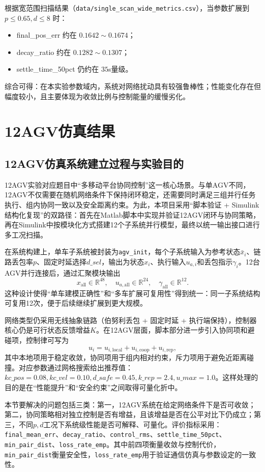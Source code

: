 \documentclass[12pt,a4paper]{article}
\begin{document}
根据宽范围扫描结果（\texttt{data/single\_scan\_wide\_metrics.csv}），当参数扩展到
$p\le0.65, d\le8$ 时：
\begin{itemize}
    \item final\_pos\_err 约在 $0.1642\sim0.1674$；
    \item decay\_ratio 约在 $0.1282\sim0.1307$；
    \item settle\_time\_50pct 仍约在 $35$s量级。
\end{itemize}
综合可得：在本实验参数域内，系统对网络扰动具有较强鲁棒性；性能变化存在但幅度较小，且主要体现为收敛比例与控制能量的缓慢劣化。

\section{12AGV仿真结果}
\subsection{12AGV仿真系统建立过程与实验目的}
12AGV实验对应题目中“多移动平台协同控制”这一核心场景。与单AGV不同，12AGV不仅需要在随机网络条件下保持闭环稳定，还需要同时满足三组并行任务执行、组内协同一致以及安全距离约束。为此，本项目采用“脚本验证 + Simulink结构化复现”的双路径：首先在Matlab脚本中实现并验证12AGV闭环与协同策略，再在Simulink中按模块化方式搭建12个子系统并行模型，最终以统一输出接口进行多工况扫描。

在系统构建上，单车子系统被封装为\texttt{agv\_init}，每个子系统输入为参考状态$\bar x_i$、链路丢包率$p$、固定时延选择$d\_{sel}$，输出为状态$x_i$、执行输入$u_{a,i}$和丢包指示$\gamma_i$。12台AGV并行连接后，通过汇聚模块输出
\[
x_{\text{all}}\in\mathbb{R}^{48},\quad
u_{a,\text{all}}\in\mathbb{R}^{24},\quad
\gamma_{\text{all}}\in\mathbb{R}^{12}.
\]
这种设计使得“单车建模正确性”和“多车扩展可复用性”得到统一：同一子系统结构可复用12次，便于后续继续扩展到更大规模。

网络类型仍采用无线抽象链路（伯努利丢包 + 固定时延 + 执行端保持），控制器核心仍是可行状态反馈增益$K$。在12AGV层面，脚本部分进一步引入协同项和避碰项，控制律可写为
\[
u_i=u_{i,\text{local}}+u_{i,\text{coop}}+u_{i,\text{rep}},
\]
其中本地项用于稳定收敛，协同项用于组内相对约束，斥力项用于避免近距离碰撞。对应参数通过网格搜索给出推荐值：$kc\_pos=0.08, kc\_vel=0.10, d\_safe=0.45, k\_rep=2.4, u\_max=1.0$。这样处理的目的是在“性能提升”和“安全约束”之间取得可量化折中。

本节要解决的问题包括三类：第一，12AGV系统在给定网络条件下是否可收敛；第二，协同策略相对独立控制是否有增益，且该增益是否在公平对比下仍成立；第三，不同$p,d$工况下系统级性能是否可解释、可量化。评价指标采用：\texttt{final\_mean\_err}、\texttt{decay\_ratio}、\texttt{control\_rms}、\texttt{settle\_time\_50pct}、\texttt{min\_pair\_dist}、\texttt{loss\_rate\_emp}。其中前四项衡量收敛与控制代价，\texttt{min\_pair\_dist}衡量安全性，\texttt{loss\_rate\_emp}用于验证通信仿真与参数设定的一致性。
\end{document}

